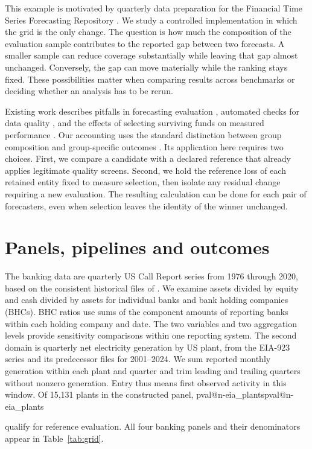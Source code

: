 \documentclass[linenumber]{jdsart}
\makeatletter
\newcommand{\val}[1]{\ifcsname pval@#1\endcsname\csname pval@#1\endcsname\else\PackageError{paper}{Missing value #1}{}\fi}
\makeatother
\begin{document}
This example is motivated by quarterly data preparation for the Financial Time Series Forecasting Repository \citep{ftsfr}. We study a controlled implementation in which the grid is the only change. The question is how much the composition of the evaluation sample contributes to the reported gap between two forecasts. A smaller sample can reduce coverage substantially while leaving that gap almost unchanged. Conversely, the gap can move materially while the ranking stays fixed. These possibilities matter when comparing results across benchmarks or deciding whether an analysis has to be rerun.

Existing work describes pitfalls in forecasting evaluation \citep{hewamalage}, automated checks for data quality \citep{schelter}, and the effects of selecting surviving funds on measured performance \citep{elton}. Our accounting uses the standard distinction between group composition and group-specific outcomes \citep{kitagawa}. Its application here requires two choices. First, we compare a candidate with a declared reference that already applies legitimate quality screens. Second, we hold the reference loss of each retained entity fixed to measure selection, then isolate any residual change requiring a new evaluation. The resulting calculation can be done for each pair of forecasters, even when selection leaves the identity of the winner unchanged.

\section{Panels, pipelines and outcomes}\label{sec:data}
The banking data are quarterly US Call Report series from 1976 through 2020, based on the consistent historical files of \citet{drechsler}. We examine assets divided by equity and cash divided by assets for individual banks and bank holding companies (BHCs). BHC ratios use sums of the component amounts of reporting banks within each holding company and date. The two variables and two aggregation levels provide sensitivity comparisons within one reporting system. The second domain is quarterly net electricity generation by US plant, from the EIA-923 series and its predecessor files for 2001--2024. We sum reported monthly generation within each plant and quarter and trim leading and trailing quarters without nonzero generation. Entry thus means first observed activity in this window. Of 15,131 plants in the constructed panel, \val{n-eia_plants} qualify for reference evaluation. All four banking panels and their denominators appear in Table~\ref{tab:grid}.
\end{document}
